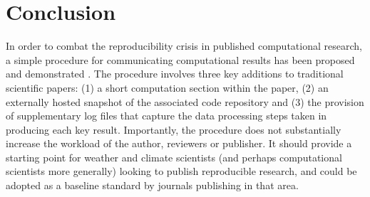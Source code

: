 \section{Conclusion}

In order to combat the reproducibility crisis in published computational research, a simple procedure for communicating computational results has been proposed and demonstrated \citep{Irving2015}. The procedure involves three key additions to traditional scientific papers: (1) a short computation section within the paper, (2) an externally hosted snapshot of the associated code repository and (3) the provision of supplementary log files that capture the data processing steps taken in producing each key result. Importantly, the procedure does not substantially increase the workload of the author, reviewers or publisher. It should provide a starting point for weather and climate scientists (and perhaps computational scientists more generally) looking to publish reproducible research, and could be adopted as a baseline standard by journals publishing in that area.